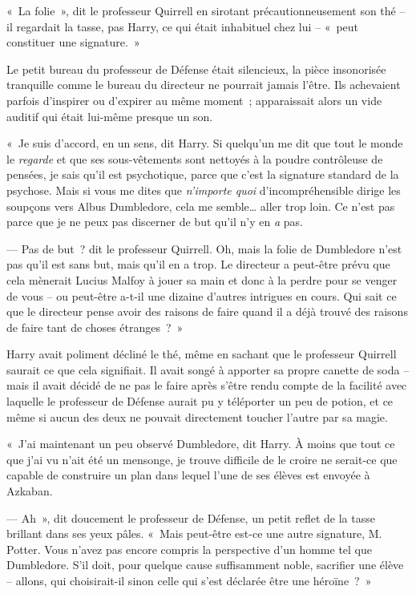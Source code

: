 «~La folie~», dit le professeur Quirrell en sirotant précautionneusement son thé -- il regardait la tasse, pas Harry, ce qui était inhabituel chez lui -- «~peut constituer une signature.~»

Le petit bureau du professeur de Défense était silencieux, la pièce insonorisée tranquille comme le bureau du directeur ne pourrait jamais l'être.
Ils achevaient parfois d'inspirer ou d'expirer au même moment~; apparaissait alors un vide auditif qui était lui-même presque un son.

«~Je suis d'accord, en un sens, dit Harry.
Si quelqu'un me dit que tout le monde le \emph{regarde} et que ses sous-vêtements sont nettoyés à la poudre contrôleuse de pensées, je sais qu'il est psychotique, parce que c'est la signature standard de la psychose.
Mais si vous me dites que \emph{n'importe quoi} d'incompréhensible dirige les soupçons vers Albus Dumbledore, cela me semble… aller trop loin.
Ce n'est pas parce que je ne peux pas discerner de but qu'il n'y en \emph{a} pas.

--- Pas de but~? dit le professeur Quirrell.
Oh, mais la folie de Dumbledore n'est pas qu'il est sans but, mais qu'il en a trop.
Le directeur a peut-être prévu que cela mènerait Lucius Malfoy à jouer sa main et donc à la perdre pour se venger de vous -- ou peut-être a-t-il une dizaine d'autres intrigues en cours.
Qui sait ce que le directeur pense avoir des raisons de faire quand il a déjà trouvé des raisons de faire tant de choses étranges~?~»

Harry avait poliment décliné le thé, même en sachant que le professeur Quirrell saurait ce que cela signifiait.
Il avait songé à apporter sa propre canette de soda -- mais il avait décidé de ne pas le faire après s'être rendu compte de la facilité avec laquelle le professeur de Défense aurait pu y téléporter un peu de potion, et ce même si aucun des deux ne pouvait directement toucher l'autre par sa magie.

«~J'ai maintenant un peu observé Dumbledore, dit Harry.
À moins que tout ce que j'ai vu n'ait été un mensonge, je trouve difficile de le croire ne serait-ce que capable de construire un plan dans lequel l'une de ses élèves est envoyée à Azkaban.

--- Ah~», dit doucement le professeur de Défense, un petit reflet de la tasse brillant dans ses yeux pâles.
«~Mais peut-être est-ce une autre signature, M. Potter.
Vous n'avez pas encore compris la perspective d'un homme tel que Dumbledore.
S'il doit, pour quelque cause suffisamment noble, sacrifier une élève -- allons, qui choisirait-il sinon celle qui s'est déclarée être une héroïne~?~»

